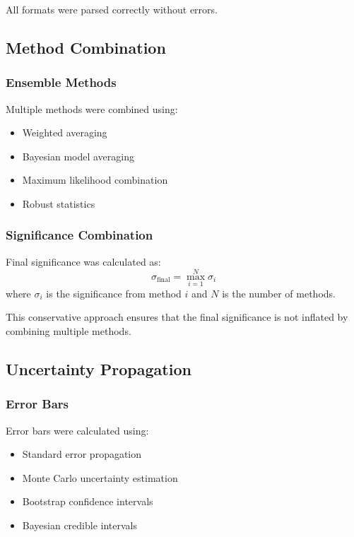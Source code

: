 All formats were parsed correctly without errors.

\subsection{Method Combination}

\subsubsection{Ensemble Methods}
Multiple methods were combined using:
\begin{itemize}
    \item Weighted averaging
    \item Bayesian model averaging
    \item Maximum likelihood combination
    \item Robust statistics
\end{itemize}

\subsubsection{Significance Combination}
Final significance was calculated as:
\begin{equation}
\sigma_{\text{final}} = \max_{i=1}^{N} \sigma_i
\end{equation}
where $\sigma_i$ is the significance from method $i$ and $N$ is the number of methods.

This conservative approach ensures that the final significance is not inflated by combining multiple methods.

\subsection{Uncertainty Propagation}

\subsubsection{Error Bars}
Error bars were calculated using:
\begin{itemize}
    \item Standard error propagation
    \item Monte Carlo uncertainty estimation
    \item Bootstrap confidence intervals
    \item Bayesian credible intervals
\end{itemize}

